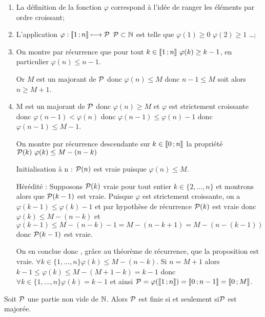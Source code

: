 \begin{enumerate}
\item La définition de la fonction $\varphi$ correspond à l'idée de ranger les éléments par ordre croissant;
\item L'application $\varphi:\intervalleentier{1}{n} \longmapsto \P$ $\P \subset \N$ est telle que $\varphi(1)\geq 0$ $\varphi(2)\geq 1$ \ldots;
\item On montre par récurrence que pour tout $k\in\intervalleentier{1}{n} \ 
\varphi(k)\geq k-1$, en particulier $\varphi(n)\leq n-1$. 

Or $M$ est un majorant de $\P$ donc $\varphi(n)\leq M$ donc $n-1\leq M$ soit alors $n\geq M+1$.
\item M est un majorant de $\P$ donc $\varphi(n)\geq M$ et $\varphi$ est strictement croissante donc $\varphi(n-1)<\varphi(n)$ donc $\varphi(n-1)\leq\varphi(n)-1$ donc $\varphi(n-1)\leq M-1$. 

On montre par récurrence descendante sur $k\in\intervalleentier{0}{n}$ la propriété $\P(k) \ \varphi(k)\leq M-(n-k)$

Initialisation à n : $\P(n)$ est vraie puisque $\varphi(n)\leq M$.

Hérédité : Supposons $\P(k)$ vraie pour tout entier $k\in\{2, \ldots,n\}$ et montrons alors que $\P(k-1)$ est vraie. Puisque $\varphi$ est strictement croissante, on a $\varphi(k-1)\leq \varphi(k)-1$ et par hypothèse de récurrence $\P(k)$ est vraie donc $\varphi(k)\leq M-(n-k)$ et $\varphi(k-1)\leq M-(n-k)-1=M-(n-k+1)=M-(n-(k-1))$ donc $\P(k-1)$ est vraie. 

On en conclue donc , grâce au théorème de récurrence, que la proposition est vraie. $\forall k \in \{1, \ldots, n\} \varphi(k)\leq M-(n-k)$. Si $n=M+1$ alors 
$k-1\leq \varphi(k)\leq M - (M+1-k)=k-1$ donc $\forall k \in \{1, \ldots,n\} \varphi(k)=k-1$ et ainsi $\P=\varphi(\intervalleentier{1}{n})=\intervalleentier{0}{n-1}= \intervalleentier{0}{M}$.
\end{enumerate}
\begin{prop}
  Soit $\P$ une partie non vide de $\N$. Alors $\P$ est finie si et seulement si$\P$ est majorée.
\end{prop}
